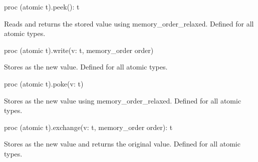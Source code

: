 \pagebreak
{}
\begin{protohead}
proc (atomic t).peek(): t
\end{protohead}
\begin{protobody}
Reads and returns the stored value using memory\_order\_relaxed.
Defined for all atomic types.
\end{protobody}

\begin{protohead}
proc (atomic t).write(v: t, memory_order order)
\end{protohead}
\begin{protobody}
Stores  as the new value. Defined for all atomic types.
\end{protobody}

\begin{protohead}
proc (atomic t).poke(v: t)
\end{protohead}
\begin{protobody}
Stores  as the new value using memory\_order\_relaxed.
Defined for all atomic types.
\end{protobody}

\begin{protohead}
proc (atomic t).exchange(v: t, memory_order order): t
\end{protohead}
\begin{protobody}
Stores  as the new value and returns the original
value. Defined for all atomic types.
\end{protobody}

